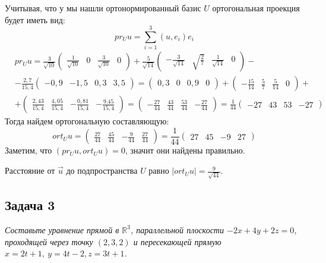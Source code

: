 	Учитывая, что у мы нашли ортонормированный базис $U$ ортогональная проекция будет иметь вид:
	\[
	pr_Uu = \sum_{i=1}^{3} (u, e_i)e_i
	\]
	\begin{align*}
	&pr_Uu = \frac{3}{\sqrt{10}}\begin{pmatrix} \frac{1}{\sqrt{10}} & 0 & \frac{3}{\sqrt{10}} & 0 \end{pmatrix} + \frac{5}{\sqrt{14}} \begin{pmatrix} -\frac{3}{\sqrt{14}} & \sqrt{\frac{2}{7}} & \frac{1}{\sqrt{14}} & 0 \end{pmatrix} -\\
	&- \frac{2,7}{15,4} \begin{pmatrix} -0,9 & -1,5 & 0,3 & 3,5 \end{pmatrix} = \begin{pmatrix} 0,3 & 0 & 0,9 & 0 \end{pmatrix} + \begin{pmatrix} -\frac{15}{14} & \frac{5}{7} & \frac{5}{14} & 0 \end{pmatrix} +\\
	&+ \begin{pmatrix} \frac{2,43}{15,4} & \frac{4,05}{15,4} & -\frac{0,81}{15,4} & -\frac{9.45}{15,4} \end{pmatrix} = \begin{pmatrix} -\frac{27}{44} & \frac{43}{44} & \frac{53}{44} & -\frac{27}{44} \end{pmatrix} = \frac{1}{44} \begin{pmatrix} -27 & 43 & 53 & -27 \end{pmatrix}
	\end{align*}
	Тогда найдем ортогональную составляющую:
	\[
	ort_Uu = \begin{pmatrix} \frac{27}{44} & \frac{45}{44} & -\frac{9}{44} & \frac{27}{44} \end{pmatrix} = \frac{1}{44} \begin{pmatrix} 27 & 45 & -9 & 27 \end{pmatrix}
	\]
	Заметим, что $(pr_Uu, ort_Uu) = 0$, значит они найдены правильно.
	
	Расстояние от $\vec u$ до подпространства $U$ равно $|ort_Uu| = \frac{9}{\sqrt{44}}$.
	
	
	\subsection{Задача 3} 
	\textit{Составьте уравнение прямой в $\mathbb{R}^3$, параллельной плоскости $-2x+4y+2z=0$, проходящей через точку $(2,3,2)$ и пересекающей прямую $x = 2t + 1,\ y = 4t - 2, z = 3t + 1$.}
	
